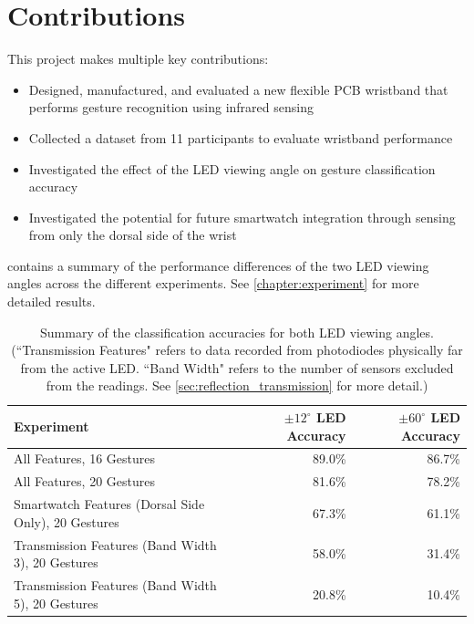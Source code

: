 \documentclass[ oneside,%
                    author={Jack Jarvis},
                    degree={BSc},
                     title={FlexIR: Flexible PCB Wristbands for Infrared Based Gesture Recognition},
                    unit={COMS30045},
                    subtitle={Investigating the Effect of LED Viewing Angle on Gesture Classification in Infrared Sensing Systems}]{dissertation}
\begin{document}
\section{Contributions}
This project makes multiple key contributions:
\begin{itemize}
    \item Designed, manufactured, and evaluated a new flexible PCB wristband that performs gesture recognition using infrared sensing
    \item Collected a dataset from 11 participants to evaluate wristband performance
    \item Investigated the effect of the LED viewing angle on gesture classification accuracy
    \item Investigated the potential for future smartwatch integration through sensing from only the dorsal side of the wrist
\end{itemize}

 contains a summary of the performance differences of the two LED viewing angles across the different experiments. See \cref{chapter:experiment} for more detailed results.

\begin{table}[htp]
    \centering
    \begin{tabular}{lrr}
        \toprule
        Experiment & $\pm 12^\circ$ LED Accuracy & $\pm 60^\circ$ LED Accuracy \\
        \midrule
        All Features, 16 Gestures & 89.0\% & 86.7\% \\
        All Features, 20 Gestures & 81.6\% & 78.2\% \\
        Smartwatch Features (Dorsal Side Only), 20 Gestures & 67.3\% & 61.1\% \\
        Transmission Features (Band Width 3), 20 Gestures & 58.0\% & 31.4\% \\
        Transmission Features (Band Width 5), 20 Gestures & 20.8\% & 10.4\% \\
        \bottomrule
    \end{tabular}
    \caption{Summary of the classification accuracies for both LED viewing angles. (``Transmission Features" refers to data recorded from photodiodes physically far from the active LED. ``Band Width" refers to the number of sensors excluded from the readings. See \cref{sec:reflection_transmission} for more detail.)}
    \label{tab:acc_summary_intro}
\end{table}

\end{document}
